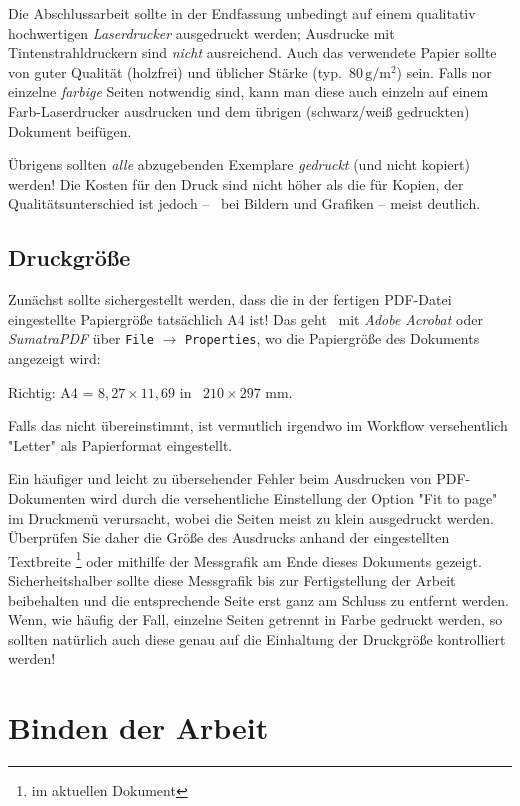 Die Abschlussarbeit sollte in der Endfassung unbedingt auf einem qualitativ
hochwertigen \emph{Laserdrucker} ausgedruckt werden; Ausdrucke mit
Tintenstrahldruckern sind \emph{nicht} ausreichend. Auch das verwendete
Papier sollte von guter Qualität (holzfrei) und üblicher Stärke (typ.\  
$80\,\mathrm{g} / \mathrm{m}^2$) sein. Falls nor einzelne \emph{farbige} Seiten 
notwendig sind, kann man diese auch einzeln auf einem Farb-Laserdrucker ausdrucken
und dem übrigen (schwarz/weiß gedruckten) Dokument beifügen.

Übrigens sollten \emph{alle} abzugebenden Exemplare \emph{gedruckt} (und
nicht kopiert) werden! Die Kosten für den Druck sind nicht höher als die für
Kopien, der Qualitätsunterschied ist jedoch -- \va\ bei Bildern und Grafiken
-- meist deutlich.

\subsection{Druckgröße}

Zunächst sollte sichergestellt werden, dass die in der fertigen PDF-Datei
eingestellte Papiergröße tatsächlich \textrm{A4} ist! Das geht \zB\ mit
\emph{Adobe Acrobat} oder \emph{SumatraPDF} über \texttt{File} $\rightarrow$
\texttt{Properties}, wo die Papiergröße des Dokuments angezeigt wird:
\begin{center}
	\textrm{Richtig:} A4 = $8{,}27 \times 11{,}69$ in \bzw\ $210 \times 297$ mm.
\end{center}
Falls das nicht übereinstimmt, ist vermutlich irgendwo im Workflow versehentlich
"Letter" als Papierformat eingestellt.


Ein häufiger und leicht zu übersehender Fehler beim Ausdrucken von
PDF-Doku\-menten wird durch die versehentliche Einstellung der Option "Fit to
page" im Druckmenü verursacht, wobei die Seiten meist zu klein ausgedruckt
werden. Überprüfen Sie daher die Größe des Ausdrucks anhand der eingestellten
Textbreite%
\footnote{\Convert[unit=mm]{\the\textwidth}	im aktuellen Dokument} %
oder mithilfe der Messgrafik am Ende dieses Dokuments gezeigt.
Sicherheitshalber sollte diese Messgrafik bis zur Fertigstellung der
Arbeit beibehalten und die entsprechende Seite erst ganz am Schluss zu
entfernt werden. Wenn, wie häufig der Fall, einzelne Seiten getrennt in Farbe
gedruckt werden, so sollten natürlich auch diese genau auf die Einhaltung der
Druckgröße kontrolliert werden!


\section{Binden der Arbeit}

